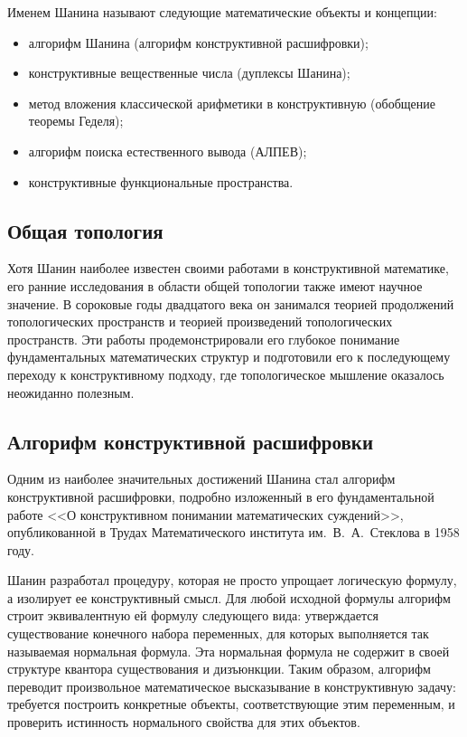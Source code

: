 \documentclass[essay,paper]{pmk-graduate}
\begin{document}
Именем Шанина называют следующие математические объекты и концепции:
\begin{itemize}
    \item алгорифм Шанина (алгорифм конструктивной расшифровки);
    \item конструктивные вещественные числа (дуплексы Шанина);
    \item метод вложения классической арифметики в конструктивную (обобщение теоремы Геделя);
    \item алгорифм поиска естественного вывода (АЛПЕВ);
    \item конструктивные функциональные пространства.
\end{itemize}

\subsection{Общая топология}

Хотя Шанин наиболее известен своими работами в конструктивной математике, его ранние исследования в области общей топологии также имеют научное значение. В сороковые годы двадцатого века он занимался теорией продолжений топологических пространств и теорией произведений топологических пространств. Эти работы продемонстрировали его глубокое понимание фундаментальных математических структур и подготовили его к последующему переходу к конструктивному подходу, где топологическое мышление оказалось неожиданно полезным.

\subsection{Алгорифм конструктивной расшифровки}

Одним из наиболее значительных достижений Шанина стал алгорифм конструктивной расшифровки, подробно изложенный в его фундаментальной работе <<О конструктивном понимании математических суждений>>, опубликованной в Трудах Математического института им.~В.~А.~Стеклова в 1958 году.

Шанин разработал процедуру, которая не просто упрощает логическую формулу, а изолирует ее конструктивный смысл. Для любой исходной формулы алгорифм строит эквивалентную ей формулу следующего вида: утверждается существование конечного набора переменных, для которых выполняется так называемая нормальная формула. Эта нормальная формула не содержит в своей структуре квантора существования и дизъюнкции. Таким образом, алгорифм переводит произвольное математическое высказывание в конструктивную задачу: требуется построить конкретные объекты, соответствующие этим переменным, и проверить истинность нормального свойства для этих объектов.
\end{document}
